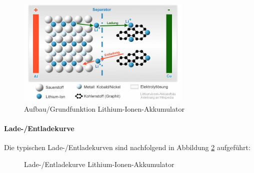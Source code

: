 \begin{figure}[h!]
	\centering
\includegraphics[width=0.74\textwidth]{images/aufbau_liion.jpg}
	\caption{Aufbau/Grundfunktion Lithium-Ionen-Akkumulator \cite{liion_akku_aufbau_funktion1}}
	\label{fig:liion_akku}
\end{figure}

\newpage

\paragraph{Lade-/Entladekurve}
Die typischen Lade-/Entladekurven sind nachfolgend in Abbildung \ref{fig:liion_akku_kurve} aufgeführt:

\begin{figure}[h!]
\caption{Lade-/Entladekurve Lithium-Ionen-Akkumulator}
\label{fig:liion_akku_kurve}
\end{figure}

